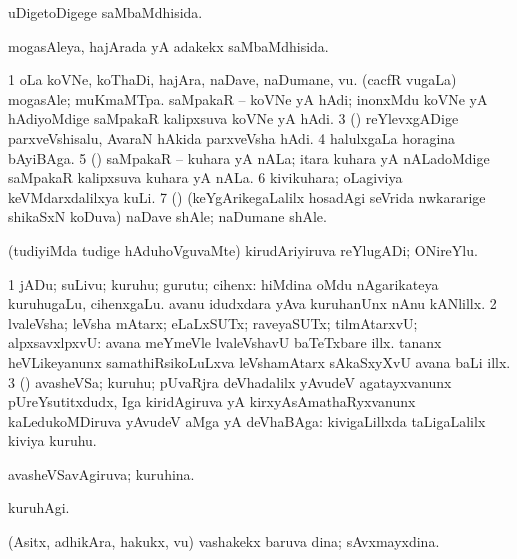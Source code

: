 {{{{\bentry
{} 
\gl{\gu}
\expl{}
\bmng
 uDigetoDigege saMbaMdhisida. 
\emng
\eentry

\bentry
{} 
\gl{\gu}
\expl{}
\bmng
 mogasAleya, hajArada yA adakekx saMbaMdhisida. 
\emng
\eentry

\bentry
{} 
\gl{\nA}
\expl{}
\bmng
\bnum
\num{1} oLa koVNe, koThaDi, hajAra, naDave, naDumane, \mo vu. 
\banum
{} (cacfR \mo vugaLa) mogasAle; muKmaMTpa. 
 saMpakaR -- koVNe yA hAdi; inonxMdu koVNe yA hAdiyoMdige saMpakaR kalipxsuva koVNe yA hAdi. 
\eanum
\numie
\num{3} (\ame) reYlevxgADige parxveVshisalu, AvaraN hAkida parxveVsha hAdi. 
\num{4} halulxgaLa horagina bAyiBAga. 
\num{5} (\aMrashA) saMpakaR -- kuhara yA nALa; itara kuhara yA nALadoMdige saMpakaR kalipxsuva kuhara yA nALa. 
\num{6} kivikuhara; oLagiviya keVMdarxdalilxya kuLi. 
\num{7} (\ame) (keYgArikegaLalilx hosadAgi seVrida nwkararige shikaSxN koDuva) naDave shAle; naDumane shAle. 
\enum
\emng
\eentry

\bentry
{} 
\gl{\nA}
\expl{}
\bmng
 (tudiyiMda tudige hAduhoVguvaMte) kirudAriyiruva reYlugADi; ONireYlu. 
\emng
\eentry

\bentry
{} 
\gl{\nA}
\expl{}
\bmng
\bnum
\num{1} jADu; suLivu; kuruhu; gurutu; cihenx:  hiMdina oMdu nAgarikateya kuruhugaLu, cihenxgaLu.  avanu idudxdara yAva kuruhanUnx nAnu kANlillx. 
\num{2} lvaleVsha; leVsha mAtarx; eLaLxSUTx; raveyaSUTx; tilmAtarxvU; alpxsavxlpxvU:  avana meYmeVle lvaleVshavU baTeTxbare illx.  tananx heVLikeyanunx samathiRsikoLuLxva leVshamAtarx sAkaSxyXvU avana baLi illx. 
\num{3} (\jiVvi) avasheVSa; kuruhu; pUvaRjra deVhadalilx yAvudeV agatayxvanunx pUreYsutitxdudx, Iga kiridAgiruva yA kirxyAsAmathaRyxvanunx kaLedukoMDiruva yAvudeV aMga yA deVhaBAga:  kivigaLillxda taLigaLalilx kiviya kuruhu. 
\enum
\emng
\eentry

\bentry
{} 
\gl{\gu}
\expl{}
\bmng
 avasheVSavAgiruva; kuruhina. 
\emng
\eentry

\bentry 
{} 
\gl{\kirxvi}
\expl{}
\bmng
 kuruhAgi. 
\emng
\eentry

\bentry
{}
\gl{\nA}
\expl{}
\bmng
 (Asitx, adhikAra, hakukx, \mo vu) vashakekx baruva dina; sAvxmayxdina. 
\emng
\eentry

}}}}
